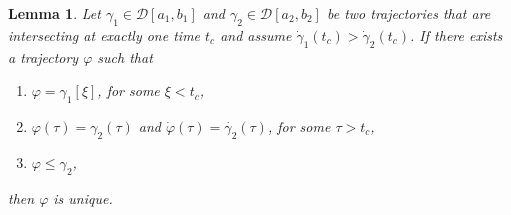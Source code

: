 \documentclass[a4paper]{article}
\theoremstyle{definition}
\theoremstyle{plain}
\newtheorem{lemma}{Lemma\hspace{0.25em}\ignorespaces}
\begin{document}
\begin{lemma}\label{lemma:curvejoining}
  Let $\gamma_{1} \in \mathcal{D}[a_{1}, b_{1}]$ and
  $\gamma_{2} \in \mathcal{D}[a_{2}, b_{2}]$ be two trajectories that are intersecting
  at exactly one time $t_{c}$ and assume
  $\dot{\gamma}_{1}(t_{c}) > \dot{\gamma}_{2}(t_{c})$.
  If there exists a trajectory $\varphi$ such that
  \begin{enumerate}[label=(\roman*)\quad,leftmargin=5em]
    \item $\varphi = \gamma_{1}[\xi]$, for some $\xi < t_{c}$,
    \item $\varphi(\tau) = \gamma_{2}(\tau)$ and
          $\dot{\varphi}(\tau) = \dot{\gamma_{2}}(\tau)$, for some $\tau > t_{c}$,
    \item $\varphi \leq \gamma_{2}$,
  \end{enumerate}
  then $\varphi$ is unique.
\end{lemma}
\end{document}
